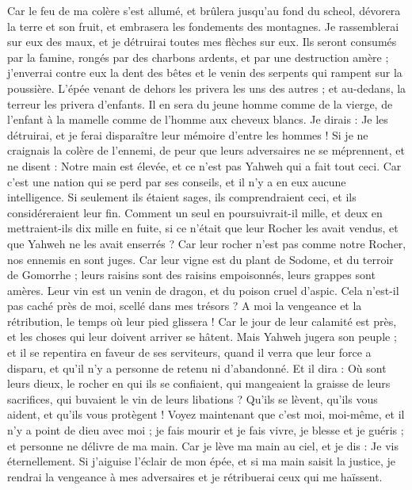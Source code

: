 \begin{multicols}{2}
Car le feu de ma colère s'est allumé, et brûlera jusqu'au fond du scheol, dévorera la terre et son fruit, et embrasera les fondements des montagnes.
Je rassemblerai sur eux des maux, et je détruirai toutes mes flèches sur eux.
Ils seront consumés par la famine, rongés par des charbons ardents, et par une destruction amère ; j'enverrai contre eux la dent des bêtes et le venin des serpents qui rampent sur la poussière.
L’épée venant de dehors les privera les uns des autres ; et au-dedans, la terreur les privera d’enfants. Il en sera du jeune homme comme de la vierge, de l'enfant à la mamelle comme de l'homme aux cheveux blancs.
Je dirais : Je les détruirai, et je ferai disparaître leur mémoire d'entre les hommes !
Si je ne craignais la colère de l’ennemi, de peur que leurs adversaires ne se méprennent, et ne disent : Notre main est élevée, et ce n’est pas Yahweh qui a fait tout ceci.
Car c’est une nation qui se perd par ses conseils, et il n'y a en eux aucune intelligence.
Si seulement ils étaient sages, ils comprendraient ceci, et ils considéreraient leur fin.
Comment un seul en poursuivrait-il mille, et deux en mettraient-ils dix mille en fuite, si ce n'était que leur Rocher les avait vendus, et que Yahweh ne les avait enserrés ?
Car leur rocher n'est pas comme notre Rocher, nos ennemis en sont juges.
Car leur vigne est du plant de Sodome, et du terroir de Gomorrhe ; leurs raisins sont des raisins empoisonnés, leurs grappes sont amères.
Leur vin est un venin de dragon, et du poison cruel d'aspic.
Cela n'est-il pas caché près de moi, scellé dans mes trésors ?
A moi la vengeance et la rétribution, le temps où leur pied glissera ! Car le jour de leur calamité est près, et les choses qui leur doivent arriver se hâtent.
Mais Yahweh jugera son peuple ; et il se repentira en faveur de ses serviteurs, quand il verra que leur force a disparu, et qu'il n'y a personne de retenu ni d’abandonné.
Et il dira : Où sont leurs dieux, le rocher en qui ils se confiaient,
qui mangeaient la graisse de leurs sacrifices, qui buvaient le vin de leurs libations ? Qu'ils se lèvent, qu'ils vous aident, et qu'ils vous protègent !
Voyez maintenant que c'est moi, moi-même, et il n'y a point de dieu avec moi\FTNT{} ; je fais mourir et je fais vivre, je blesse et je guéris ; et personne ne délivre de ma main.
Car je lève ma main au ciel, et je dis : Je vis éternellement.
Si j'aiguise l’éclair de mon épée, et si ma main saisit la justice, je rendrai la vengeance à mes adversaires et je rétribuerai ceux qui me haïssent.

\end{multicols}
